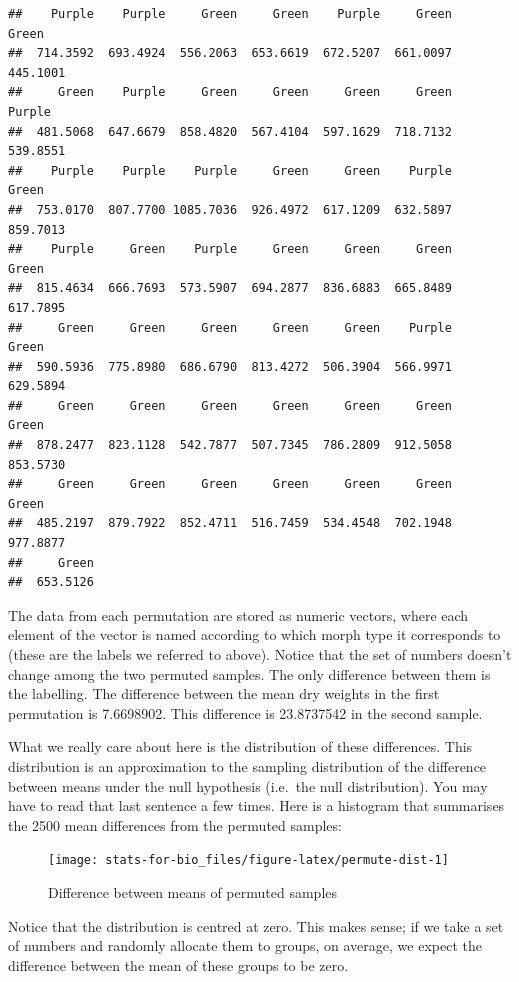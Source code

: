 \documentclass[]{book}
\begin{document}
\begin{verbatim}
##    Purple    Purple     Green     Green    Purple     Green     Green 
##  714.3592  693.4924  556.2063  653.6619  672.5207  661.0097  445.1001 
##     Green    Purple     Green     Green     Green     Green    Purple 
##  481.5068  647.6679  858.4820  567.4104  597.1629  718.7132  539.8551 
##    Purple    Purple    Purple     Green     Green    Purple     Green 
##  753.0170  807.7700 1085.7036  926.4972  617.1209  632.5897  859.7013 
##    Purple     Green    Purple     Green     Green     Green     Green 
##  815.4634  666.7693  573.5907  694.2877  836.6883  665.8489  617.7895 
##     Green     Green     Green     Green     Green    Purple     Green 
##  590.5936  775.8980  686.6790  813.4272  506.3904  566.9971  629.5894 
##     Green     Green     Green     Green     Green     Green     Green 
##  878.2477  823.1128  542.7877  507.7345  786.2809  912.5058  853.5730 
##     Green     Green     Green     Green     Green     Green     Green 
##  485.2197  879.7922  852.4711  516.7459  534.4548  702.1948  977.8877 
##     Green 
##  653.5126
\end{verbatim}

The data from each permutation are stored as numeric vectors, where each
element of the vector is named according to which morph type it
corresponds to (these are the labels we referred to above). Notice that
the set of numbers doesn't change among the two permuted samples. The
only difference between them is the labelling. The difference between
the mean dry weights in the first permutation is 7.6698902. This
difference is 23.8737542 in the second sample.

What we really care about here is the distribution of these differences.
This distribution is an approximation to the sampling distribution of
the difference between means under the null hypothesis (i.e.~the null
distribution). You may have to read that last sentence a few times. Here
is a histogram that summarises the 2500 mean differences from the
permuted samples:

\begin{figure}

{\centering \texttt{[image: stats-for-bio\_files/figure-latex/permute-dist-1]} 

}

\caption{Difference between means of permuted samples}\label{fig:permute-dist}
\end{figure}

Notice that the distribution is centred at zero. This makes sense; if we
take a set of numbers and randomly allocate them to groups, on average,
we expect the difference between the mean of these groups to be zero.
\end{document}
